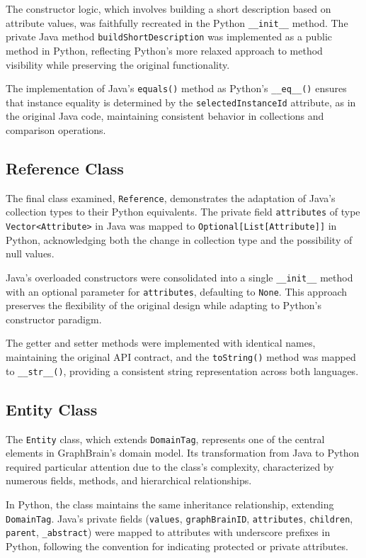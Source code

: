 \documentclass[12pt,a4paper]{article}
\begin{document}
The constructor logic, which involves building a short description based on attribute values, was faithfully recreated in the Python \texttt{\_\_init\_\_} method. The private Java method \texttt{buildShortDescription} was implemented as a public method in Python, reflecting Python's more relaxed approach to method visibility while preserving the original functionality.

The implementation of Java's \texttt{equals()} method as Python's \texttt{\_\_eq\_\_()} ensures that instance equality is determined by the \texttt{selectedInstanceId} attribute, as in the original Java code, maintaining consistent behavior in collections and comparison operations.

\subsection{Reference Class}
The final class examined, \texttt{Reference}, demonstrates the adaptation of Java's collection types to their Python equivalents. The private field \texttt{attributes} of type \texttt{Vector<Attribute>} in Java was mapped to \texttt{Optional[List[Attribute]]} in Python, acknowledging both the change in collection type and the possibility of null values.

Java's overloaded constructors were consolidated into a single \texttt{\_\_init\_\_} method with an optional parameter for \texttt{attributes}, defaulting to \texttt{None}. This approach preserves the flexibility of the original design while adapting to Python's constructor paradigm.

The getter and setter methods were implemented with identical names, maintaining the original API contract, and the \texttt{toString()} method was mapped to \texttt{\_\_str\_\_()}, providing a consistent string representation across both languages.

\subsection{Entity Class}

The \texttt{Entity} class, which extends \texttt{DomainTag}, represents one of the central elements in GraphBrain's domain model. Its transformation from Java to Python required particular attention due to the class's complexity, characterized by numerous fields, methods, and hierarchical relationships.

In Python, the class maintains the same inheritance relationship, extending \texttt{DomainTag}. Java's private fields (\texttt{values}, \texttt{graphBrainID}, \texttt{attributes}, \texttt{children}, \texttt{parent}, \texttt{\_abstract}) were mapped to attributes with underscore prefixes in Python, following the convention for indicating protected or private attributes.
\end{document}
